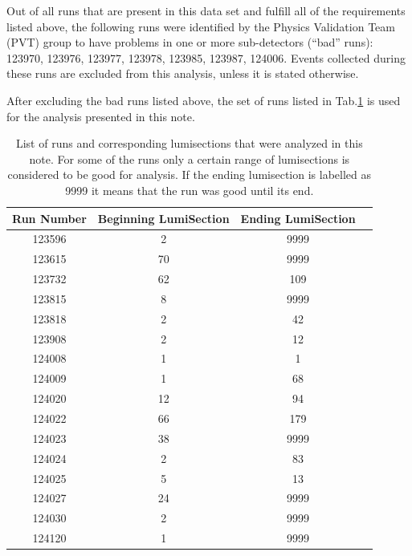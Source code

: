Out of all runs that are present in this data set and fulfill all
of the requirements listed above, the following runs were identified 
by the Physics Validation Team (PVT) group to have
problems in one or more sub-detectors (``bad'' runs): 123970, 123976, 123977, 
123978, 123985, 123987, 124006. 
Events collected during these runs are excluded
from this analysis, unless it is stated otherwise.

After excluding the bad runs listed above, the set of runs listed in
Tab.\ref{tab:goodruns} is used for the analysis presented in this
note. 

\begin{table}[h]
  \begin{center}
    \begin{tabular}{|c|c|c|c|}
      \hline
      Run Number      & Beginning LumiSection  & Ending LumiSection   \\\hline\hline
      123596              & 2   & 9999\\ 
      123615              & 70 & 9999\\
      123732              & 62 & 109\\
      123815              & 8   & 9999\\
      123818              & 2   & 42\\
      123908              & 2   & 12\\
      124008              & 1   & 1\\
      124009              & 1   & 68\\
      124020              & 12 & 94\\
      124022              & 66 & 179\\
      124023              & 38 & 9999\\
      124024              & 2   & 83\\
      124025              & 5   & 13\\
      124027              & 24 & 9999\\
      124030              & 2   & 9999\\
      124120              & 1   & 9999\\
      \hline    
    \end{tabular}
    \caption{List of runs and corresponding lumisections that were analyzed in this note. For some of
      the runs only a certain range of lumisections is considered to be
      good for analysis. If the ending lumisection is labelled as 9999 it
      means that the run was good until its end.}
    \label{tab:goodruns}
  \end{center}
\end{table}

